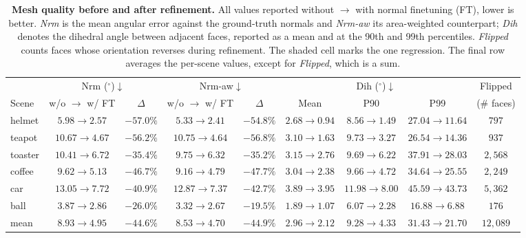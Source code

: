 \begin{table}[t]
\centering
\small
\setlength{\tabcolsep}{3pt}
\caption{\textbf{Mesh quality before and after refinement.}
All values reported without $\rightarrow$ with normal finetuning (FT), lower is
better. \emph{Nrm} is the mean angular error against the ground-truth normals and
\emph{Nrm-aw} its area-weighted counterpart; \emph{Dih} denotes the dihedral
angle between adjacent faces, reported as a mean and at the 90th and 99th
percentiles. \emph{Flipped} counts faces whose orientation reverses during
refinement. The shaded cell marks the one regression. The final row averages the
per-scene values, except for \emph{Flipped}, which is a sum.}
\label{tab:mesh_quality}

\begin{tabular}{l cc cc ccc c}
\toprule
& \multicolumn{2}{c}{Nrm ($^\circ$)$\downarrow$}
& \multicolumn{2}{c}{Nrm-aw$\downarrow$}
& \multicolumn{3}{c}{Dih ($^\circ$)$\downarrow$}
& Flipped \\
\cmidrule(lr){2-3} \cmidrule(lr){4-5} \cmidrule(lr){6-8} \cmidrule(lr){9-9}
Scene
& w/o $\rightarrow$ w/ FT & $\Delta$
& w/o $\rightarrow$ w/ FT & $\Delta$
& Mean & P90 & P99
& (\# faces) \\
\midrule
helmet  & $5.98 \rightarrow 2.57$   & $-57.0\%$ & $5.33 \rightarrow 2.41$   & $-54.8\%$ & $2.68 \rightarrow 0.94$ & $8.56 \rightarrow 1.49$  & $27.04 \rightarrow 11.64$ & $797$ \\
teapot  & $10.67 \rightarrow 4.67$  & $-56.2\%$ & $10.75 \rightarrow 4.64$  & $-56.8\%$ & $3.10 \rightarrow 1.63$ & $9.73 \rightarrow 3.27$  & $26.54 \rightarrow 14.36$ & $937$ \\
toaster & $10.41 \rightarrow 6.72$  & $-35.4\%$ & $9.75 \rightarrow 6.32$   & $-35.2\%$ & $3.15 \rightarrow 2.76$ & $9.69 \rightarrow 6.22$  & $37.91 \rightarrow 28.03$ & $2{,}568$ \\
coffee  & $9.62 \rightarrow 5.13$   & $-46.7\%$ & $9.16 \rightarrow 4.79$   & $-47.7\%$ & $3.04 \rightarrow 2.38$ & $9.66 \rightarrow 4.72$  & $34.64 \rightarrow 25.55$ & $2{,}249$ \\
car     & $13.05 \rightarrow 7.72$  & $-40.9\%$ & $12.87 \rightarrow 7.37$  & $-42.7\%$ & \cellcolor{red!15} $3.89 \rightarrow 3.95$ & $11.98 \rightarrow 8.00$ & $45.59 \rightarrow 43.73$ & $5{,}362$ \\
ball    & $3.87 \rightarrow 2.86$   & $-26.0\%$ & $3.32 \rightarrow 2.67$   & $-19.5\%$ & $1.89 \rightarrow 1.07$ & $6.07 \rightarrow 2.28$  & $16.88 \rightarrow 6.88$  & $176$ \\
\midrule
mean    & $8.93 \rightarrow 4.95$   & $-44.6\%$ & $8.53 \rightarrow 4.70$   & $-44.9\%$ & $2.96 \rightarrow 2.12$ & $9.28 \rightarrow 4.33$  & $31.43 \rightarrow 21.70$ & $12{,}089$ \\
\bottomrule
\end{tabular}
\end{table}